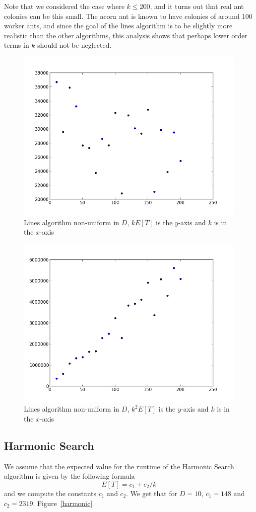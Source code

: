 \documentclass[runningheads,a4paper]{llncs}
\begin{document}
Note that we considered the case where $k \leq 200$, and it turns out that real ant colonies can be this small. The acorn ant is known to have colonies of around 100 worker ants, and since the goal of the lines algorithm is to be slightly more realistic than the other algorithms, this analysis shows that perhaps lower order terms in $k$ should not be neglected.

\begin{figure}
\centering
\label{nonuniforminD}
\includegraphics[width=0.5\linewidth]{LinesNonUniformnT.png}
\caption{Lines algorithm non-uniform in $D$, $kE[T]$ is the $y$-axis and $k$ is in the $x$-axis}
\end{figure}

\begin{figure}
\centering
\label{nonuniforminDtwo}
\includegraphics[width=0.5\linewidth]{LinesNonUniformn2T.png}
\caption{Lines algorithm non-uniform in $D$, $k^2E[T]$ is the $y$-axis and $k$ is in the $x$-axis}
\end{figure}

\subsection{Harmonic Search}

We assume that the expected value for the runtime of the Harmonic Search algorithm is given by the following formula
\[ E[T] = c_1 + c_2 / k \]
and we compute the constants $c_1$ and $c_2$. We get that for $D=10$, $c_1 = 148$ and $c_2 = 2319$. Figure~\ref{harmonic}
\end{document}
